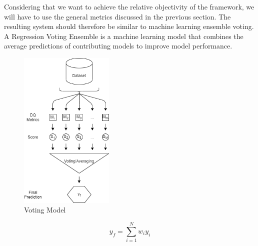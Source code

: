 
Considering that we want to achieve the relative objectivity of the framework, we will have to use the general metrics discussed in the previous section.
The resulting system should therefore be similar to machine learning ensemble voting.
A Regression Voting Ensemble is a machine learning model that combines the average predictions of contributing models to improve model performance.

\begin{figure}[htb]
    \centering
    \includegraphics[width=0.4\textwidth]{figures/voting.png}
    \caption{Voting Model}
    \label{fig:voting}
\end{figure}
\FloatBarrier

\begin{equation*}
    y_f = \sum_{i = 1}^{N} w_i y_i
\end{equation*}
